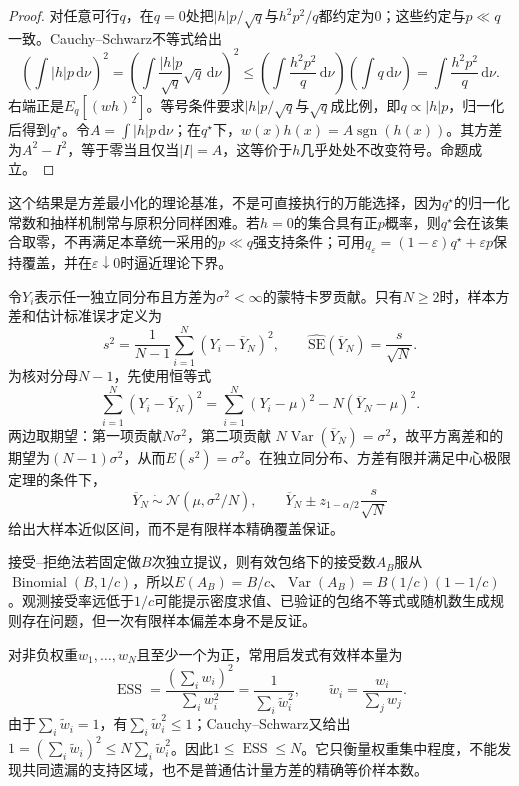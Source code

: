 \begin{proof}
对任意可行$q$，在$q=0$处把$|h|p/\sqrt q$与$h^2p^2/q$都约定为$0$；这些约定与$p\ll q$一致。Cauchy--Schwarz不等式给出
\[
\left(\int|h|p\,\mathrm d\nu\right)^2
=\left(\int\frac{|h|p}{\sqrt q}\sqrt q\,\mathrm d\nu\right)^2
\le\left(\int\frac{h^2p^2}{q}\,\mathrm d\nu\right)
\left(\int q\,\mathrm d\nu\right)
=\int\frac{h^2p^2}{q}\,\mathrm d\nu.
\]
右端正是$E_q[(wh)^2]$。等号条件要求$|h|p/\sqrt q$与$\sqrt q$成比例，即$q\propto|h|p$，归一化后得到$q^\star$。令$A=\int|h|p\,\mathrm d\nu$；在$q^\star$下，$w(x)h(x)=A\operatorname{sgn}(h(x))$。其方差为$A^2-I^2$，等于零当且仅当$|I|=A$，这等价于$h$几乎处处不改变符号。命题成立。
\end{proof}
这个结果是方差最小化的理论基准，不是可直接执行的万能选择，因为$q^\star$的归一化常数和抽样机制常与原积分同样困难。若$h=0$的集合具有正$p$概率，则$q^\star$会在该集合取零，不再满足本章统一采用的$p\ll q$强支持条件；可用$q_\varepsilon=(1-\varepsilon)q^\star+\varepsilon p$保持覆盖，并在$\varepsilon\downarrow0$时逼近理论下界。

令$Y_i$表示任一独立同分布且方差为$\sigma^2<\infty$的蒙特卡罗贡献。只有$N\ge2$时，样本方差和估计标准误才定义为
\begin{equation}\label{eq:V5-C02-sample-variance}
s^2=\frac1{N-1}\sum_{i=1}^N(Y_i-\overline Y_N)^2,
\qquad \widehat{\mathrm{SE}}(\overline Y_N)=\frac{s}{\sqrt N}.
\end{equation}
为核对分母$N-1$，先使用恒等式
\[
\sum_{i=1}^N(Y_i-\overline Y_N)^2
=\sum_{i=1}^N(Y_i-\mu)^2-N(\overline Y_N-\mu)^2.
\]
两边取期望：第一项贡献$N\sigma^2$，第二项贡献
$N\operatorname{Var}(\overline Y_N)=\sigma^2$，故平方离差和的期望为$(N-1)\sigma^2$，从而$E(s^2)=\sigma^2$。在独立同分布、方差有限并满足中心极限定理的条件下，
\begin{equation}\label{eq:V5-C02-clt-interval}
\overline Y_N\ \dot\sim\ \mathcal N(\mu,\sigma^2/N),
\qquad
\overline Y_N\pm z_{1-\alpha/2}\frac{s}{\sqrt N}
\end{equation}
给出大样本近似区间，而不是有限样本精确覆盖保证。

接受--拒绝法若固定做$B$次独立提议，则有效包络下的接受数$A_B$服从$\operatorname{Binomial}(B,1/c)$，所以$E(A_B)=B/c$、$\operatorname{Var}(A_B)=B(1/c)(1-1/c)$。观测接受率远低于$1/c$可能提示密度求值、已验证的包络不等式或随机数生成规则存在问题，但一次有限样本偏差本身不是反证。

对非负权重$w_1,\ldots,w_N$且至少一个为正，常用启发式有效样本量为
\begin{equation}\label{eq:V5-C02-ess}
\operatorname{ESS}=\frac{(\sum_iw_i)^2}{\sum_iw_i^2}
=\frac1{\sum_i\widetilde w_i^2},
\qquad \widetilde w_i=\frac{w_i}{\sum_jw_j}.
\end{equation}
由于$\sum_i\widetilde w_i=1$，有$\sum_i\widetilde w_i^2\le1$；Cauchy--Schwarz又给出$1=(\sum_i\widetilde w_i)^2\le N\sum_i\widetilde w_i^2$。因此$1\le\operatorname{ESS}\le N$。它只衡量权重集中程度，不能发现共同遗漏的支持区域，也不是普通估计量方差的精确等价样本数。

